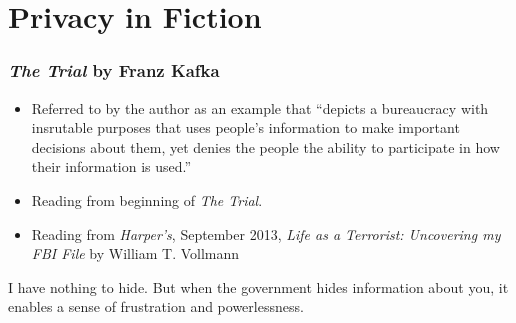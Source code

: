 \documentclass{beamer}
\begin{document}
\section{Privacy in Fiction}











\begin{frame}
\frametitle{\emph{The Trial} by Franz Kafka}

\begin{itemize}
\item Referred to by the author as an example that ``depicts a
  bureaucracy with insrutable purposes that uses people's information
  to make important decisions about them, yet denies the people the
  ability to participate in how their information is used.''

\item Reading from beginning of \emph{The Trial}.
\item Reading from \emph{Harper's}, September 2013, \emph{Life as a
  Terrorist: Uncovering my FBI File} by William T. Vollmann
\end{itemize}

\begin{block}{I have nothing to hide.}
    But when the government hides information about you, it enables a
    sense of frustration and powerlessness.
  \end{block}


\end{frame}
\end{document}
